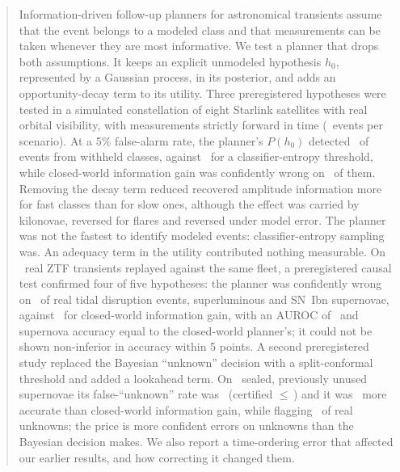 \begin{abstract}
Information-driven follow-up planners for astronomical transients assume that the event belongs to a modeled class and that measurements can be taken whenever they are most informative. We test a planner that drops both assumptions. It keeps an explicit unmodeled hypothesis $h_0$, represented by a Gaussian process, in its posterior, and adds an opportunity-decay term to its utility. Three preregistered hypotheses were tested in a simulated constellation of eight Starlink satellites with real orbital visibility, with measurements strictly forward in time (\SimNEvents\ events per scenario). At a 5\% false-alarm rate, the planner's $P(h_0)$ detected \SimTprP\ of events from withheld classes, against \SimTprBthree\ for a classifier-entropy threshold, while closed-world information gain was confidently wrong on \SimCwWhBthreeAll\ of them. Removing the decay term reduced recovered amplitude information more for fast classes than for slow ones, although the effect was carried by kilonovae, reversed for flares and reversed under model error. The planner was not the fastest to identify modeled events: classifier-entropy sampling was. An adequacy term in the utility contributed nothing measurable. On \RealNEvents\ real ZTF transients replayed against the same fleet, a preregistered causal test confirmed four of five hypotheses: the planner was confidently wrong on \RealCCwWhP\ of real tidal disruption events, superluminous and SN~Ibn supernovae, against \RealCCwWhBthree\ for closed-world information gain, with an AUROC of \RealCAuc\ and supernova accuracy equal to the closed-world planner's; it could not be shown non-inferior in accuracy within 5 points. A second preregistered study replaced the Bayesian ``unknown'' decision with a split-conformal threshold and added a lookahead term. On \ConfNFresh\ sealed, previously unused supernovae its false-``unknown'' rate was \ConfFa\ (certified $\leq$\,\ConfAlphaPct) and it was \ConfAccGain\ more accurate than closed-world information gain, while flagging \ConfFlag\ of real unknowns; the price is more confident errors on unknowns than the Bayesian decision makes. We also report a time-ordering error that affected our earlier results, and how correcting it changed them.
\end{abstract}
